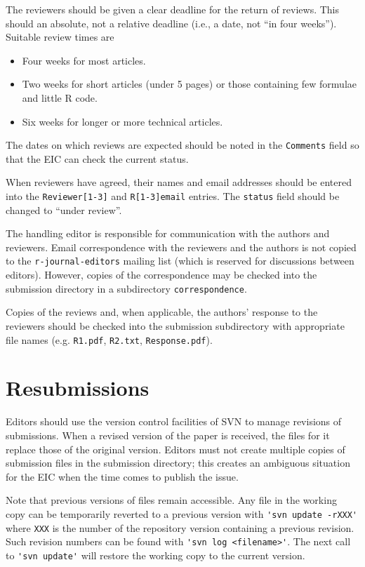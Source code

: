 \documentclass[11pt]{article}
\begin{document}
The reviewers should be given a clear deadline for the return of
reviews.  This should an absolute, not a relative deadline (i.e., a
date, not ``in four weeks''). Suitable review times are
\begin{itemize}
\item Four weeks for most articles.
\item Two weeks for short articles (under 5 pages) or those containing
few formulae and little R code.
\item Six weeks for longer or more technical articles.
\end{itemize}
The dates on which reviews are expected should be noted in the
\texttt{Comments} field so that the EIC can check the current status.

When reviewers have agreed, their names and email addresses should
be entered into the \verb+Reviewer[1-3]+ and \verb+R[1-3]email+ entries.
The \texttt{status} field should be changed to ``under review''.

The handling editor is responsible for communication with the authors
and reviewers. Email correspondence with the reviewers and the authors
is not copied to the \verb+r-journal-editors+ mailing list (which is
reserved for discussions between editors). However, copies of the
correspondence may be checked into the submission directory in a
subdirectory \texttt{correspondence}.

Copies of the reviews and, when applicable, the authors' response to
the reviewers should be checked into the submission subdirectory with
appropriate file names (e.g. \texttt{R1.pdf}, \texttt{R2.txt},
\texttt{Response.pdf}).

\section{Resubmissions}

Editors should use the version control facilities of SVN to manage
revisions of submissions. When a revised version of the paper is
received, the files for it replace those of the original
version. Editors must not create multiple copies of submission files
in the submission directory; this creates an ambiguous situation for
the EIC when the time comes to publish the issue.

Note that previous versions of files remain accessible.  Any file in
the working copy can be temporarily reverted to a previous version
with \verb+'svn update -rXXX'+ where \verb+XXX+ is the number of the
repository version containing a previous revision.  Such revision
numbers can be found with \verb+'svn log <filename>'+. The next call
to \verb+'svn update'+ will restore the working copy to the current
version.
\end{document}
